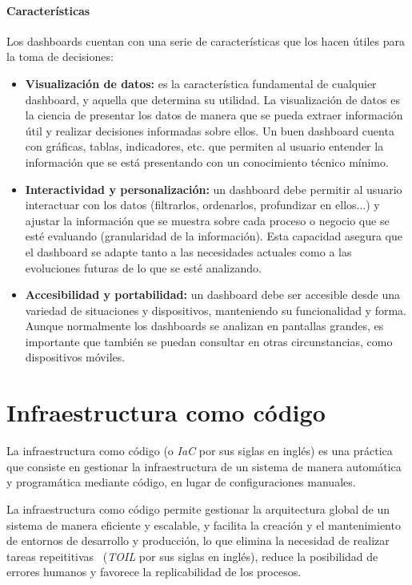 \paragraph{Características}
Los dashboards cuentan con una serie de características que los hacen útiles
para la toma de decisiones:~\cite{mier2023dashboards}

\begin{itemize}
	\item \textbf{Visualización de datos:} es la característica fundamental de
		cualquier dashboard, y aquella que determina su utilidad.
		La visualización de datos es la ciencia de presentar los datos de manera
		que se pueda extraer información útil y realizar decisiones informadas
		sobre ellos. Un buen dashboard cuenta con gráficas, tablas, indicadores,
		etc. que permiten al usuario entender la información que se está
		presentando con un conocimiento técnico mínimo.
	\item \textbf{Interactividad y personalización:} un dashboard debe permitir
		al usuario interactuar con los datos (filtrarlos, ordenarlos,
		profundizar en ellos...) y ajustar la información que se muestra sobre
		cada proceso o negocio que se esté evaluando (granularidad de la
		información). Esta capacidad asegura que el dashboard se adapte tanto a
		las necesidades actuales como a las evoluciones futuras de lo que se
		esté analizando.
	\item \textbf{Accesibilidad y portabilidad:} un dashboard debe ser accesible
		desde una variedad de situaciones y dispositivos, manteniendo su
		funcionalidad y forma. Aunque normalmente los dashboards se analizan en
		pantallas grandes, es importante que también se puedan consultar en
		otras circunstancias, como dispositivos móviles.
\end{itemize}


\newpage{}
\section{Infraestructura como código}
La infraestructura como código (o \textit{IaC} por sus siglas en inglés) es una
práctica que consiste en gestionar la infraestructura de un sistema de manera
automática y programática mediante código, en lugar de configuraciones manuales.

La infraestructura como código permite gestionar la arquitectura global de un
sistema de manera eficiente y escalable, y facilita la creación y el mantenimiento
de entornos de desarrollo y producción, lo que elimina la necesidad de realizar
tareas repeititivas~\cite{beyer2016site} (\textit{TOIL} por sus siglas en
inglés), reduce la posibilidad de errores humanos y favorece la replicabilidad
de los procesos.

